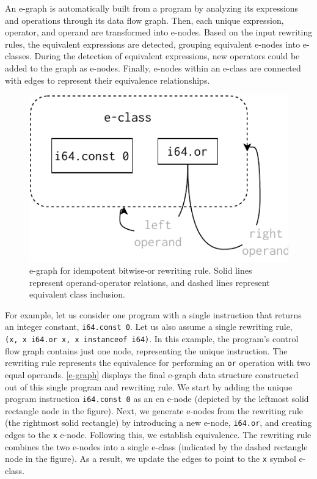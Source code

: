 \documentclass[sigplan,screen]{acmart}
\begin{document}
An e-graph is automatically built from a program by analyzing its expressions and operations through its data flow graph.
Then, each unique expression, operator, and operand are transformed into e-nodes.
Based on the input rewriting rules, the equivalent expressions are detected, grouping equivalent e-nodes into e-classes.
During the detection of equivalent expressions, new operators could be added to the graph as e-nodes.
Finally, e-nodes within an e-class are connected with edges to represent their equivalence relationships.

\begin{figure}
    \centering
    \includegraphics[width=0.7\linewidth]{figures/egraph1.pdf}
    \caption{e-graph for idempotent bitwise-or rewriting rule. Solid lines represent operand-operator relations, and dashed lines represent equivalent class inclusion. }
  \label{e-graph}
\end{figure}

For example, let us consider one program with a single instruction that returns an integer constant, \texttt{i64.const 0}. Let us also assume a single rewriting rule, \texttt{(x,\ x\ i64.or\ x, x instanceof i64)}. 
In this example, the program's control flow graph contains just one node, representing the unique instruction.
The rewriting rule represents the equivalence for performing an \texttt{or} operation with two equal operands.
\autoref{e-graph} displays the final e-graph data structure constructed out of this single program and rewriting rule. 
We start by adding the unique program instruction \texttt{i64.const 0} as an en e-node (depicted by the leftmost solid rectangle node in the figure). 
Next, we generate e-nodes from the rewriting rule (the rightmost solid rectangle) by introducing a new e-node, \texttt{i64.or}, and creating edges to the \texttt{x} e-node.
Following this, we establish equivalence. 
The rewriting rule combines the two e-nodes into a single e-class (indicated by the dashed rectangle node in the figure). 
As a result, we update the edges to point to the \texttt{x} symbol e-class.
\end{document}
